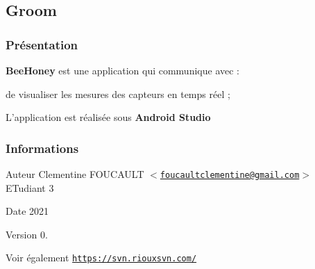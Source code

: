 \hypertarget{page__r_e_a_d_m_e_projet}{}\subsection{Groom}\label{page__r_e_a_d_m_e_projet}
\hypertarget{page__r_e_a_d_m_e_presentation}{}\subsubsection{Présentation}\label{page__r_e_a_d_m_e_presentation}
{\bfseries Bee\+Honey} est une application qui communique avec \+:


\begin{DoxyItemize}
\item de visualiser les mesures des capteurs en temps réel ;
\end{DoxyItemize}

L’application est réalisée sous {\bfseries Android Studio}\hypertarget{page__r_e_a_d_m_e_informations}{}\subsubsection{Informations}\label{page__r_e_a_d_m_e_informations}
\begin{DoxyAuthor}{Auteur}
Clementine F\+O\+U\+C\+A\+U\+LT $<$\href{mailto:foucaultclementine@gmail.com}{\tt foucaultclementine@gmail.\+com}$>$ E\+Tudiant 3 
\end{DoxyAuthor}
\begin{DoxyDate}{Date}
2021 
\end{DoxyDate}
\begin{DoxyVersion}{Version}
0. 
\end{DoxyVersion}
\begin{DoxySeeAlso}{Voir également}
\href{https://svn.riouxsvn.com/}{\tt https\+://svn.\+riouxsvn.\+com/} 
\end{DoxySeeAlso}
